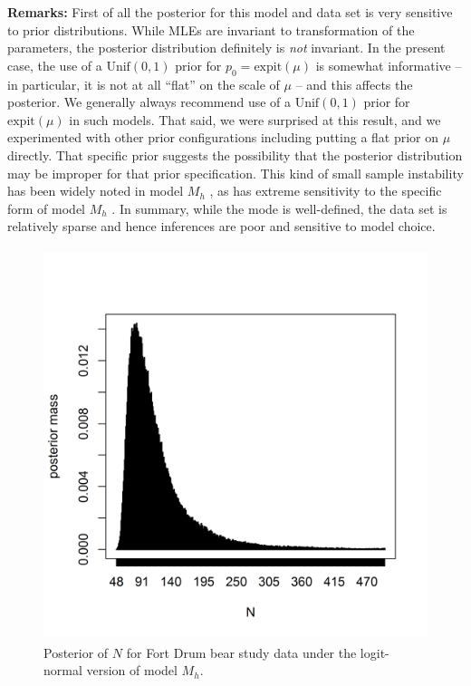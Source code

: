 {\bf Remarks:} 
First of all the posterior for this model and data set is
very sensitive to prior distributions. While MLEs are invariant to
transformation of the parameters, the posterior distribution
definitely is {\it not} invariant. In the present case, the use of a
$\mbox{Unif}(0,1)$ prior for $p_{0} = \mbox{expit}(\mu)$ is somewhat
informative -- in particular, it is not at all ``flat'' on the scale
of $\mu$ -- and this affects the posterior.  We generally always
recommend use of a $\mbox{Unif}(0,1)$ prior for $\mbox{expit}(\mu)$ in such
models. That said, we were surprised at this result, and we
experimented with other prior configurations including putting a flat
prior on $\mu$ directly. That specific prior suggests the possibility
that the posterior distribution may be improper for that prior
specification. This kind of small sample instability has been widely
noted in model $M_h$ \citep{fienberg_etal:1999, dorazio_royle:2003},
as has extreme sensitivity to the specific form of model $M_{h}$ \citep{link:2003}.
In summary, while the mode is well-defined, the data set is relatively
sparse and hence inferences are poor and sensitive to model choice. 

\begin{figure}
\centering
\includegraphics[height=4.5in,width=4.5in]{Ch3/figs/bear-modelMh-post}
\caption{Posterior of $N$ for Fort Drum bear study data under the
logit-normal version of model $M_h$. 
}
\label{closed.fig.bearMh}
\end{figure}




